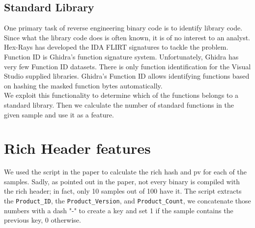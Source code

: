 \subsection{Standard Library}

One primary task of reverse engineering binary code is to identify library code. Since what the library code does is often known, it is of no interest to an analyst. Hex-Rays has developed the IDA FLIRT signatures to tackle the problem. Function ID is Ghidra's function signature system. Unfortunately, Ghidra has very few Function ID datasets. There is only function identification for the Visual Studio supplied libraries. Ghidra's Function ID allows identifying functions based on hashing the masked function bytes automatically.\cite{ghidra_fid}\\

We exploit this functionality to determine which of the functions belongs to a standard library. Then we calculate the number of standard functions in the given sample and use it as a feature.

\section{Rich Header features}
We used the script in the paper to calculate the rich hash and pv for each of the samples. Sadly, as pointed out in the paper, not every binary is compiled with the rich header; in fact, only 10 samples out of 100 have it. The script extracts the \texttt{Product\_ID}, the \texttt{Product\_Version}, and \texttt{Product\_Count}, we concatenate those numbers with a dash "-" to create a key and set 1 if the sample contains the previous key, 0 otherwise.

